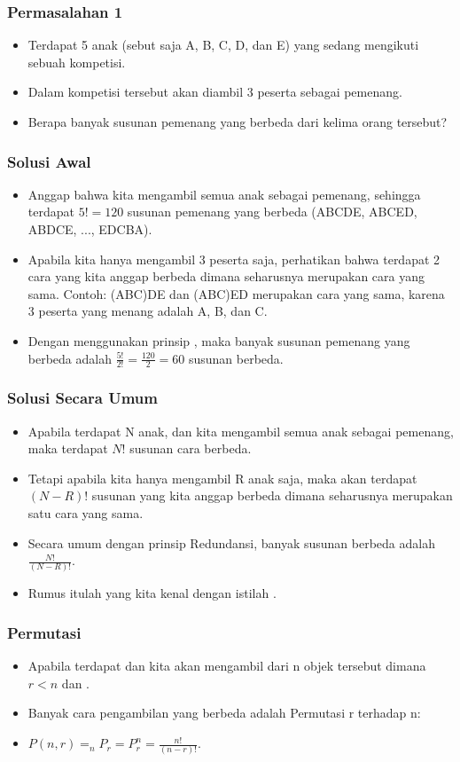 \begin{frame}
\frametitle{Permasalahan 1}
\begin{itemize}
  \item Terdapat 5 anak (sebut saja A, B, C, D, dan E) yang sedang mengikuti sebuah kompetisi.
  \item Dalam kompetisi tersebut akan diambil 3 peserta sebagai pemenang.
  \item Berapa banyak susunan pemenang yang berbeda dari kelima orang tersebut?
\end{itemize}
\end{frame}

\begin{frame}
\frametitle{Solusi Awal}
\begin{itemize}
  \item Anggap bahwa kita mengambil semua anak sebagai pemenang, sehingga terdapat $5! = 120$ susunan pemenang yang berbeda (ABCDE, ABCED, ABDCE, ..., EDCBA).
  \item Apabila kita hanya mengambil 3 peserta saja, perhatikan bahwa terdapat 2 cara yang kita anggap berbeda dimana seharusnya merupakan cara yang sama. Contoh: (ABC)DE dan (ABC)ED merupakan cara yang sama, karena 3 peserta yang menang adalah A, B, dan C.
  \item Dengan menggunakan prinsip , maka banyak susunan pemenang yang berbeda adalah $\frac{5!}{2!} = \frac{120}{2} = 60$ susunan berbeda.
\end{itemize}
\end{frame}

\begin{frame}
\frametitle{Solusi Secara Umum}
\begin{itemize}
  \item Apabila terdapat N anak, dan kita mengambil semua anak sebagai pemenang, maka terdapat $N!$ susunan cara berbeda.
  \item Tetapi apabila kita hanya mengambil R anak saja, maka akan terdapat $(N-R)!$ susunan yang kita anggap berbeda dimana seharusnya merupakan satu cara yang sama.
  \item Secara umum dengan prinsip Redundansi, banyak susunan berbeda adalah $\frac{N!}{(N-R)!}$.
  \item Rumus itulah yang kita kenal dengan istilah .
\end{itemize}
\end{frame}


\begin{frame}
\frametitle{Permutasi}
\begin{itemize}
  \item Apabila terdapat  dan kita akan mengambil  dari n objek tersebut dimana $r<n$ dan .
  \item Banyak cara pengambilan yang berbeda adalah Permutasi r terhadap n: 
  \item $P(n,r) = _{n}P_{r} = P^{n}_{r} = \frac{n!}{(n-r)!}$.
\end{itemize}
\end{frame}

